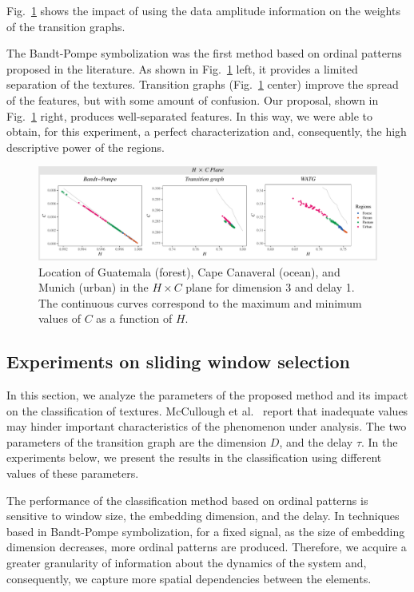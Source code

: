 \documentclass[journal]{IEEEtran}
\begin{document}
Fig.~\ref{fig:plotsHC} shows the impact of using the data amplitude information on the weights of the transition graphs.

The Bandt-Pompe symbolization was the first method based on ordinal patterns proposed in the literature.
As shown in Fig.~\ref{fig:plotsHC} left, it provides a limited separation of the textures.
Transition graphs (Fig.~\ref{fig:plotsHC} center) improve the spread of the features, but with some amount of confusion.
Our proposal, shown in Fig.~\ref{fig:plotsHC} right, produces well-separated features.
In this way, we were able to obtain, for this experiment, a perfect characterization and, consequently, the high descriptive power of the regions.

\begin{figure}[hbt]
	\includegraphics[width=2\columnwidth]{Figures/HCAnalysis.pdf}
	\caption{Location of Guatemala (forest), Cape Canaveral (ocean), and Munich (urban) in the $H \times C$ plane for dimension 3 and delay 1. 
		The continuous curves correspond to the maximum and minimum values of $C$ as a function of $H$.}
	\label{fig:plotsHC}
\end{figure}

\subsection{Experiments on sliding window selection}

In this section, we analyze the parameters of the proposed method and its impact on the classification of textures.
McCullough et al.~\cite{McCullough2015lagged} report that inadequate values may hinder important characteristics of the phenomenon under analysis.
The two parameters of the transition graph are the dimension $D$, and the delay $\tau$.
In the experiments below, we present the results in the classification using different values of these parameters.

The performance of the classification method based on ordinal patterns is sensitive to window size, the embedding dimension, and the delay.
In techniques based in Bandt-Pompe symbolization, for a fixed signal, as the size of embedding dimension decreases, more ordinal patterns are produced.
Therefore, we acquire a greater granularity of information about the dynamics of the system and, consequently, we capture more spatial dependencies between the elements.
\end{document}
